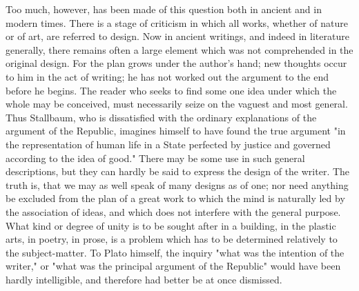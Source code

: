Too much, however, has been made of this question both in ancient and in modern times. There is a stage of criticism in which all works, whether of nature or of art, are referred to design. Now in ancient writings, and indeed in literature generally, there remains often a large element which was not comprehended in the original design. For the plan grows under the author's hand; new thoughts occur to him in the act of writing; he has not worked out the argument to the end before he begins. The reader who seeks to find some one idea under which the whole may be conceived, must necessarily seize on the vaguest and most general. Thus Stallbaum, who is dissatisfied with the ordinary explanations of the argument of the Republic, imagines himself to have found the true argument "in the representation of human life in a State perfected by justice and governed according to the idea of good." There may be some use in such general descriptions, but they can hardly be said to express the design of the writer. The truth is, that we may as well speak of many designs as of one; nor need anything be excluded from the plan of a great work to which the mind is naturally led by the association of ideas, and which does not interfere with the general purpose. What kind or degree of unity is to be sought after in a building, in the plastic arts, in poetry, in prose, is a problem which has to be determined relatively to the subject-matter. To Plato himself, the inquiry "what was the intention of the writer," or "what was the principal argument of the Republic" would have been hardly intelligible, and therefore had better be at once dismissed.

